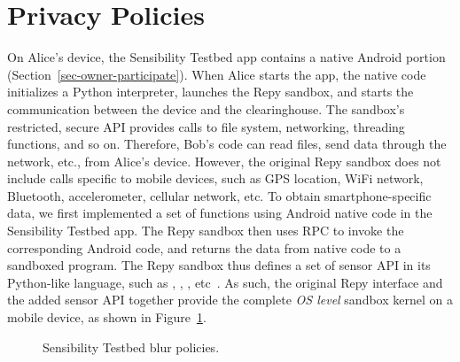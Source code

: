 \section{Privacy Policies}\label{sec-policy}

On Alice's device, the Sensibility Testbed app contains a native Android portion
(Section~\ref{sec-owner-participate}). When Alice starts the app, the native code initializes a
Python interpreter, launches the Repy sandbox, and starts the communication between the device and
the clearinghouse. The sandbox's restricted, secure API provides calls to file system, networking,
threading functions, and so on. Therefore, Bob's code can read files, send data through the
network, etc., from Alice's device. However, the original Repy sandbox does not include calls
specific to mobile devices, such as GPS location, WiFi network, Bluetooth, accelerometer, cellular
network, etc. To obtain smartphone-specific data, we first implemented a set of functions using
Android native code in the Sensibility Testbed app. The Repy sandbox then uses RPC to invoke the
corresponding Android code, and returns the data from native code to a sandboxed program. The Repy
sandbox thus defines a set of sensor API in its Python-like language, such as
, , , etc~\cite{sensor-api}. As
such, the original Repy interface and the added sensor API together provide the complete \textit{OS
level} sandbox kernel on a mobile device, as shown in Figure~\ref{fig-blur}.

\begin{figure}
\caption{\small Sensibility Testbed blur policies. 
\label{fig-blur}}
\end{figure}

